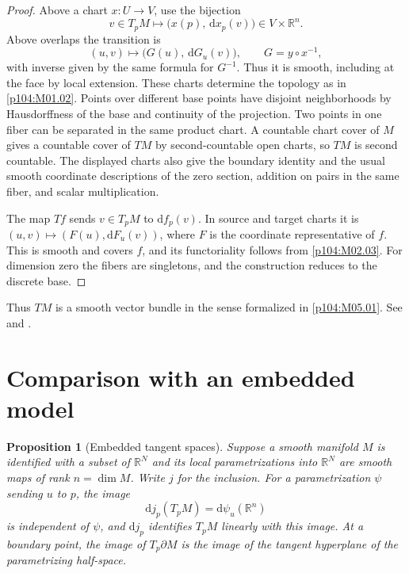 \documentclass[11pt,oneside,openany]{book}
\newtheorem{proposition}[theorem]{Proposition}
\theoremstyle{definition}
\theoremstyle{remark}
\newcommand{\R}{\mathbb R}
\newcommand{\dd}{\mathrm d}
\begin{document}
\begin{proof}
Above a chart \(x:U\to V\), use the bijection
\[
  v\in T_pM \longmapsto \bigl(x(p),\,\dd x_p(v)\bigr)
  \in V\times\R^n.
\]
Above overlaps the transition is
\[
  (u,v)\longmapsto
  \bigl(G(u),\,\dd G_u(v)\bigr),\qquad
  G=y\circ x^{-1},
\]
with inverse given by the same formula for \(G^{-1}\).
Thus it is smooth, including at the face by local
extension. These charts determine the topology as in
\cref{p104:M01.02}. Points over different base points
have disjoint neighborhoods by Hausdorffness of the
base and continuity of the projection. Two points in
one fiber can be separated in the same product chart.
A countable chart cover of \(M\) gives a countable
cover of \(TM\) by second-countable open charts,
so \(TM\) is second countable. The displayed charts
also give the boundary identity and the usual smooth
coordinate descriptions of the zero section, addition
on pairs in the same fiber, and scalar multiplication.

The map \(Tf\) sends \(v\in T_pM\) to \(\dd f_p(v)\).
In source and target charts it is
\((u,v)\mapsto(F(u),\dd F_u(v))\), where \(F\) is the
coordinate representative of \(f\). This is smooth
and covers \(f\), and its functoriality follows from
\cref{p104:M02.03}. For dimension zero the fibers
are singletons, and the construction reduces to the
discrete base.
\end{proof}

Thus \(TM\) is a smooth vector bundle in the sense
formalized in \cref{p104:M05.01}. See
\cite[pp.~65--73]{lee} and \cite[Sections~10 and 12]{tu}.

\section{Comparison with an embedded model}

\begin{proposition}[Embedded tangent spaces]\label{p104:M02.05}
Suppose a smooth manifold \(M\) is identified with a subset
of \(\R^N\) and its local parametrizations into \(\R^N\)
are smooth maps of rank \(n=\dim M\). Write \(j\) for the
inclusion. For a parametrization \(\psi\) sending \(u\)
to \(p\), the image
\[
   \dd j_p(T_pM)=\dd\psi_u(\R^n)
\]
is independent of \(\psi\), and \(\dd j_p\) identifies
\(T_pM\) linearly with this image. At a boundary point,
the image of \(T_p\partial M\) is the image of the
tangent hyperplane of the parametrizing half-space.
\end{proposition}
\end{document}
